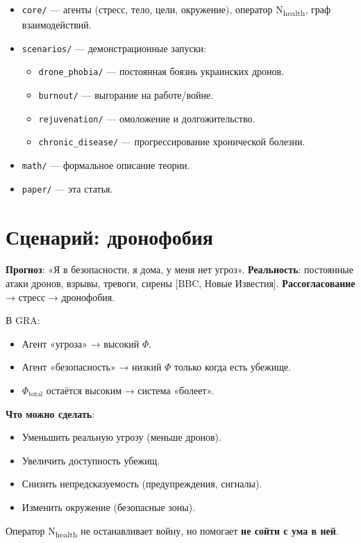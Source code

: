 \documentclass[11pt,a4paper]{article}
\begin{document}
\begin{itemize}
  \item \texttt{core/} — агенты (стресс, тело, цели, окружение), оператор N\textsubscript{health}, граф взаимодействий.
  \item \texttt{scenarios/} — демонстрационные запуски:
  \begin{itemize}
    \item \texttt{drone\_phobia/} — постоянная боязнь украинских дронов.
    \item \texttt{burnout/} — выгорание на работе/войне.
    \item \texttt{rejuvenation/} — омоложение и долгожительство.
    \item \texttt{chronic\_disease/} — прогрессирование хронической болезни.
  \end{itemize}
  \item \texttt{math/} — формальное описание теории.
  \item \texttt{paper/} — эта статья.
\end{itemize}

\section{Сценарий: дронофобия}

\textbf{Прогноз}: «Я в безопасности, я дома, у меня нет угроз».  
\textbf{Реальность}: постоянные атаки дронов, взрывы, тревоги, сирены [BBC, Новые Известия].  
\textbf{Рассогласование} → стресс → дронофобия.

В GRA:
\begin{itemize}
  \item Агент «угроза» → высокий $\Phi$.
  \item Агент «безопасность» → низкий $\Phi$ только когда есть убежище.
  \item $\Phi_{\text{total}}$ остаётся высоким → система «болеет».
\end{itemize}

\textbf{Что можно сделать}:
\begin{itemize}
  \item Уменьшить реальную угрозу (меньше дронов).
  \item Увеличить доступность убежищ.
  \item Снизить непредсказуемость (предупреждения, сигналы).
  \item Изменить окружение (безопасные зоны).
\end{itemize}

Оператор N\textsubscript{health} не останавливает войну, но помогает \textbf{не сойти с ума в ней}.
\end{document}

